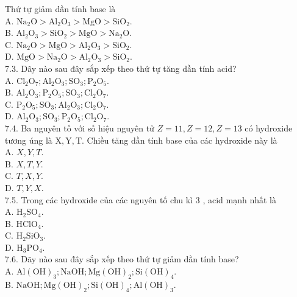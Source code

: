 \documentclass[10pt]{article}
\begin{document}
Thứ tự giảm dần tính base là\\
A. $\mathrm{Na}_{2} \mathrm{O}>\mathrm{Al}_{2} \mathrm{O}_{3}>\mathrm{MgO}>\mathrm{SiO}_{2}$.\\
B. $\mathrm{Al}_{2} \mathrm{O}_{3}>\mathrm{SiO}_{2}>\mathrm{MgO}>\mathrm{Na}_{2} \mathrm{O}$.\\
C. $\mathrm{Na}_{2} \mathrm{O}>\mathrm{MgO}>\mathrm{Al}_{2} \mathrm{O}_{3}>\mathrm{SiO}_{2}$.\\
D. $\mathrm{MgO}>\mathrm{Na}_{2} \mathrm{O}>\mathrm{Al}_{2} \mathrm{O}_{3}>\mathrm{SiO}_{2}$.\\
7.3. Dãy nào sau đây sắp xếp theo thứ tự tăng dần tính acid?\\
A. $\mathrm{Cl}_{2} \mathrm{O}_{7} ; \mathrm{Al}_{2} \mathrm{O}_{3} ; \mathrm{SO}_{3} ; \mathrm{P}_{2} \mathrm{O}_{5}$.\\
B. $\mathrm{Al}_{2} \mathrm{O}_{3} ; \mathrm{P}_{2} \mathrm{O}_{5} ; \mathrm{SO}_{3} ; \mathrm{Cl}_{2} \mathrm{O}_{7}$.\\
C. $\mathrm{P}_{2} \mathrm{O}_{5} ; \mathrm{SO}_{3} ; \mathrm{Al}_{2} \mathrm{O}_{3} ; \mathrm{Cl}_{2} \mathrm{O}_{7}$.\\
D. $\mathrm{Al}_{2} \mathrm{O}_{3} ; \mathrm{SO}_{3} ; \mathrm{P}_{2} \mathrm{O}_{5} ; \mathrm{Cl}_{2} \mathrm{O}_{7}$.\\
7.4. Ba nguyên tố với số hiệu nguyên tử $Z=11, Z=12, Z=13$ có hydroxide tương úng là $\mathrm{X}, \mathrm{Y}, \mathrm{T}$. Chiều tăng dần tính base của các hydroxide này là\\
A. $X, Y, T$.\\
B. $X, T, Y$.\\
C. $T, X, Y$.\\
D. $T, Y, X$.\\
7.5. Trong các hydroxide của các nguyên tố chu kì 3 , acid mạnh nhất là\\
A. $\mathrm{H}_{2} \mathrm{SO}_{4}$.\\
B. $\mathrm{HClO}_{4}$.\\
C. $\mathrm{H}_{2} \mathrm{SiO}_{3}$.\\
D. $\mathrm{H}_{3} \mathrm{PO}_{4}$.\\
7.6. Dãy nào sau đây sắp xếp theo thứ tự giảm dần tính base?\\
A. $\mathrm{Al}(\mathrm{OH})_{3} ; \mathrm{NaOH} ; \mathrm{Mg}(\mathrm{OH})_{2} ; \mathrm{Si}(\mathrm{OH})_{4}$.\\
B. $\mathrm{NaOH} ; \mathrm{Mg}(\mathrm{OH})_{2} ; \mathrm{Si}(\mathrm{OH})_{4} ; \mathrm{Al}(\mathrm{OH})_{3}$.\\
\end{document}
